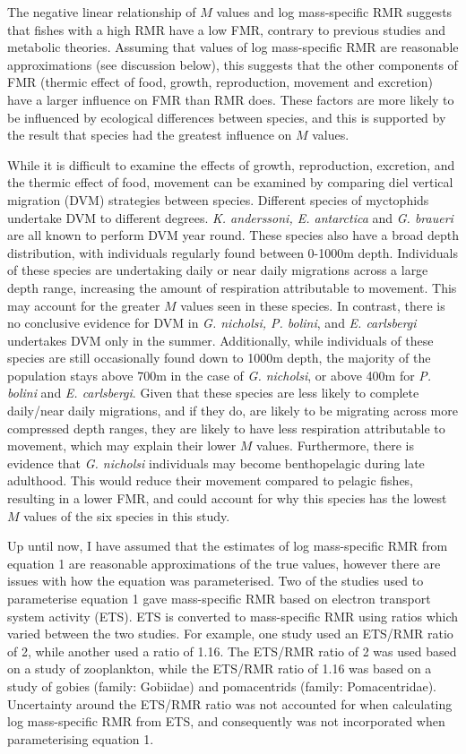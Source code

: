 \documentclass[12pt, titlepage]{article}
\begin{document}
The negative linear relationship of $M$ values and log mass-specific RMR suggests that fishes with a high RMR have a low FMR, contrary to previous studies and metabolic theories.
Assuming that values of log mass-specific RMR are reasonable approximations (see discussion below), this suggests that the other components of FMR (thermic effect of food, growth, reproduction, movement and excretion) have a larger influence on FMR than RMR does.
These factors are more likely to be influenced by ecological differences between species, and this is supported by the result that species had the greatest influence on $M$ values.

While it is difficult to examine the effects of growth, reproduction, excretion, and the thermic effect of food, movement can be examined by comparing diel vertical migration (DVM) strategies between species.
Different species of myctophids undertake DVM to different degrees. %
\textit{K. anderssoni, E. antarctica} and \textit{G. braueri} are all known to perform DVM year round.
These species also have a broad depth distribution, with individuals regularly found between 0-1000m depth.
Individuals of these species are undertaking daily or near daily migrations across a large depth range, increasing the amount of respiration attributable to movement.
This may account for the greater $M$ values seen in these species.
In contrast, there is no conclusive evidence for DVM in \textit{G. nicholsi, P. bolini}, and \textit{E. carlsbergi} undertakes DVM only in the summer.
Additionally, while individuals of these species are still occasionally found down to 1000m depth, the majority of the population stays above 700m in the case of \textit{G. nicholsi}, or above 400m for \textit{P. bolini} and \textit{E. carlsbergi}.
Given that these species are less likely to complete daily/near daily migrations, and if they do, are likely to be migrating across more compressed depth ranges, they are likely to have less respiration attributable to movement, which may explain their lower $M$ values.
Furthermore, there is evidence that \textit{G. nicholsi} individuals may become benthopelagic during late adulthood.
This would reduce their movement compared to pelagic fishes, resulting in a lower FMR, and could account for why this species has the lowest $M$ values of the six species in this study.

Up until now, I have assumed that the estimates of log mass-specific RMR from equation 1 are reasonable approximations of the true values, however there are issues with how the equation was parameterised.
Two of the studies used to parameterise equation 1 gave mass-specific RMR based on electron transport system activity (ETS).
ETS is converted to mass-specific RMR using ratios which varied between the two studies.
For example, one study used an ETS/RMR ratio of 2, %
while another used a ratio of 1.16. %
The ETS/RMR ratio of 2 was used based on a study of zooplankton, %
while the ETS/RMR ratio of 1.16 was based on a study of gobies (family: Gobiidae) and pomacentrids (family: Pomacentridae). %
Uncertainty around the ETS/RMR ratio was not accounted for when calculating log mass-specific RMR from ETS, and consequently was not incorporated when parameterising equation 1.
\end{document}
